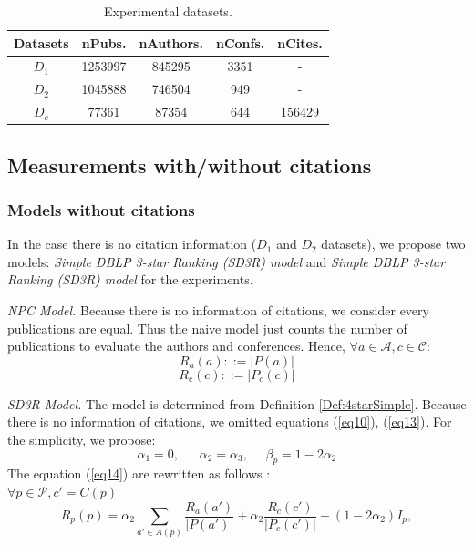 \documentclass[10pt,leqno,twoside]{article}
\begin{document}
\begin{center}
\begin{table}
	\centering
	\caption{Experimental datasets.}
    \label{Tab:Dataset}
    \begin{tabular}{|c|c|c|c|c|}
    \hline
    \textbf{Datasets} & \textbf{nPubs.} & \textbf{nAuthors. } & \textbf{nConfs.} & \textbf{nCites.} \\ \hline
   $D_1$ & 1253997 & 845295 & 3351 & - \\
   $D_2$ & 1045888 & 746504 & 949 & - \\
   $D_c$ & 77361 & 87354 & 644 & 156429 \\
    \hline
    \end{tabular}
\end{table}
\end{center}

\subsection{Measurements with/without citations}\label{Sect:Measure}
\subsubsection{Models without citations}
In the case there is no citation information ($D_1$ and $D_2$ datasets), we propose two models: \textit{Simple DBLP 3-star Ranking (SD3R) model} and \textit{Simple DBLP 3-star Ranking (SD3R) model} for the experiments.

\textit{NPC Model.} Because there is no information of citations, we consider every publications are equal. Thus the naive model just counts the number of publications to evaluate the authors and conferences.  Hence,
 $\forall a \in \mathcal{A}, c \in \mathcal{C}:$
\begin{equation}
R_a(a) ::= |P(a)|
\end{equation}
\begin{equation}
R_c(c) ::= |P_c(c)|
\end{equation}

\textit{SD3R Model.} The model is determined from Definition \ref{Def:4starSimple}.  Because there is no information of citations, we omitted equations (\ref{eq10}), (\ref{eq13}). For the simplicity,  we propose:
$$\alpha_1=0,~~~~~~~ \alpha_2=\alpha_3,~~~~~~  \beta_p = 1-2\alpha_2 $$
The equation (\ref{eq14}) are rewritten as follows :\\
$\forall p\in\mathcal{P}, c' = C(p)$\
\begin{equation}\label{eq15}
R_p(p) = \alpha_2\sum_{a'\in A(p)}\frac{R_a(a')}{|P(a')|} + \alpha_2\frac{R_c(c')}{|P_c(c')|} + (1-2\alpha_2)I_p,
\end{equation}
%
\end{document}
